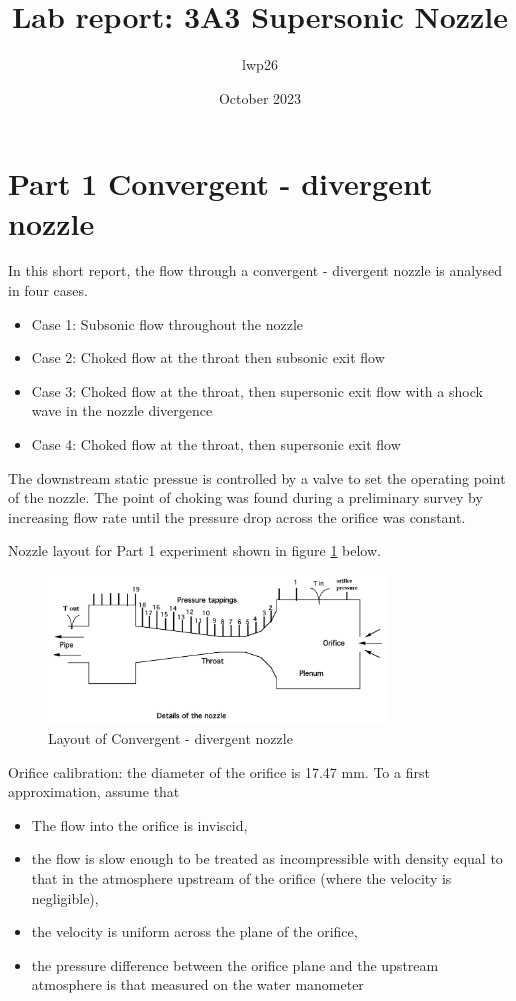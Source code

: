 \documentclass[8pt]{article}
\begin{document}

\title{Lab report: 3A3 Supersonic Nozzle}
\author{lwp26}
\date{October 2023}
\maketitle

\section{Part 1 Convergent - divergent nozzle}

In this short report, the flow through a convergent - divergent nozzle is analysed in four cases.

\begin{itemize}
    \item Case 1: Subsonic flow throughout the nozzle
    \item Case 2: Choked flow at the throat then subsonic exit flow
    \item Case 3: Choked flow at the throat, then supersonic exit flow with a shock wave in the nozzle divergence
    \item Case 4: Choked flow at the throat, then supersonic exit flow
\end{itemize}

The downstream static pressue is controlled by a valve to set the operating point of the nozzle.
The point of choking was found during a preliminary survey by increasing flow rate until the pressure drop across the orifice was constant.

Nozzle layout for Part 1 experiment shown in figure \ref{fig:figure1} below.

\begin{figure}[H]
    \centering
    \includegraphics[width=0.8\textwidth]{small_nozzle_layout.png}
    \caption{Layout of Convergent - divergent nozzle}
    \label{fig:figure1}
\end{figure}

Orifice calibration: the diameter of the orifice is 17.47 mm. To a first approximation, assume that
\begin{itemize}
    \item The flow into the orifice is inviscid,
    \item the flow is slow enough to be treated as incompressible with density equal to that in the atmosphere upstream of the orifice (where the velocity is negligible),
    \item the velocity is uniform across the plane of the orifice,
    \item the pressure difference between the orifice plane and the upstream atmosphere is that measured on the
    water manometer
\end{itemize} 
\end{document}
